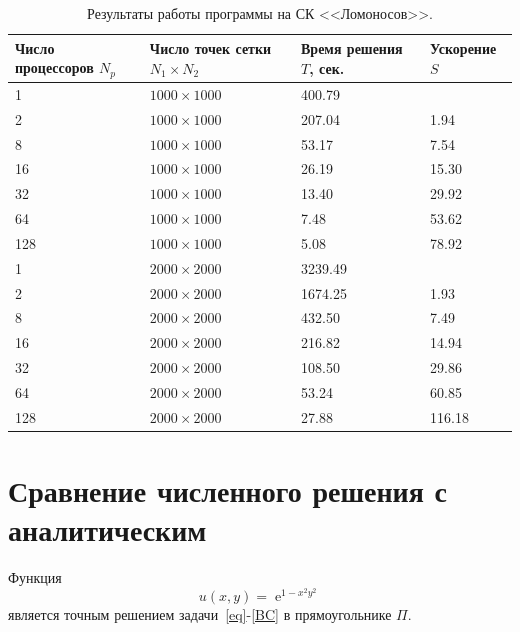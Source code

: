 \documentclass[11pt]{article}
\numberwithin{equation}{section}
\theoremstyle{plain}
\theoremstyle{definition}
\DeclareMathOperator{\expon}{e}
\begin{document}
\begin{table}[h]
\centering
\begin{tabular}{|l|l|l|l|}\hline
Число процессоров $N_p$ & Число точек сетки $N_1 \times N_2$ & Время решения $T$, сек. & Ускорение $S$ \\ \hline
1                       & $1000 \times 1000$                 & 400.79                  &               \\
2                       & $1000 \times 1000$                 & 207.04                  & 1.94          \\
8                       & $1000 \times 1000$                 & 53.17                   & 7.54          \\
16                      & $1000 \times 1000$                 & 26.19                   & 15.30         \\
32                      & $1000 \times 1000$                 & 13.40                   & 29.92         \\
64                      & $1000 \times 1000$                 & 7.48                    & 53.62         \\
128                     & $1000 \times 1000$                 & 5.08                    & 78.92         \\ \hline
1                       & $2000 \times 2000$                 & 3239.49                 &               \\
2                       & $2000 \times 2000$                 & 1674.25                 & 1.93          \\
8                       & $2000 \times 2000$                 & 432.50                  & 7.49          \\
16                      & $2000 \times 2000$                 & 216.82                  & 14.94         \\
32                      & $2000 \times 2000$                 & 108.50                  & 29.86         \\
64                      & $2000 \times 2000$                 & 53.24                   & 60.85         \\
128                     & $2000 \times 2000$                 & 27.88                   & 116.18        \\ \hline
\end{tabular}
    \caption{Результаты работы программы на СК <<Ломоносов>>.}
\label{tab_lom}
\end{table}

\newpage
\section{Сравнение численного решения с аналитическим}
Функция \[u(x,y)=\expon^{1-x^2y^2}\]
является точным решением задачи~\eqref{eq}-\eqref{BC} в прямоугольнике \(\Pi.\)
\end{document}
